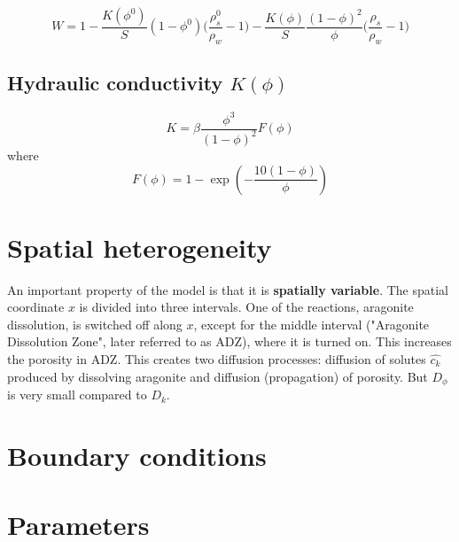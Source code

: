 \documentclass[11pt, letterpaper]{article}
\begin{document}
\begin{equation}
    W = 1 - \frac{K(\phi^0)}{S}(1-\phi^0) \big(\frac{\rho_s^0}{\rho_w}-1) - \frac{K(\phi)}{S} \frac{(1-\phi)^2}{\phi}\big(\frac{\rho_s}{\rho_w}-1\big)
\end{equation}

\section{Hydraulic conductivity $K(\phi)$}

\begin{equation}
    K = \beta \frac{\phi^3}{(1 - \phi)^2}F(\phi)
\end{equation}
where
\begin{equation}
    F(\phi) = 1 - \exp\left( -\frac{10(1-\phi)}{\phi} \right)
\end{equation}

\chapter{Spatial heterogeneity}

An important property of the model is that it is \textbf{spatially variable}. The spatial coordinate $x$ is divided into three intervals. One of the reactions, aragonite dissolution, is switched off along $x$, except for the middle interval ("Aragonite Dissolution Zone", later referred to as ADZ), where it is turned on. This increases the porosity in ADZ. This creates two diffusion processes: diffusion of solutes $\hat{c_k}$ produced by dissolving aragonite and diffusion (propagation) of porosity. But $D_{\phi}$ is very small compared to $D_k$.

\chapter{Boundary conditions}

\chapter{Parameters}
\end{document}
